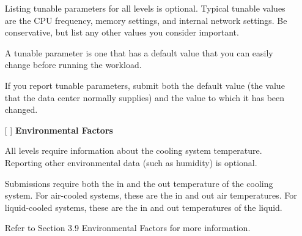 \begin{itemize}
Listing tunable parameters for all levels is optional.
Typical tunable values are the CPU frequency, memory settings, and internal network settings. Be conservative, but list any other values you consider important.

A tunable parameter is one that has a default value that you can easily change before running the workload.

If you report tunable parameters, submit both the default value (the value that the data center normally supplies) and the value to which it has been changed.

\newpage
\item[{[ ]}]
\textbf{Environmental Factors}

All levels require information about the cooling system temperature. Reporting other environmental data (such as humidity) is optional. 

Submissions require both the in and the out temperature of the cooling system. For air-cooled systems, these are the in and out air temperatures. For liquid-cooled systems, these are the in and out temperatures of the liquid.

Refer to Section 3.9 Environmental Factors for more information.

\end{itemize}

